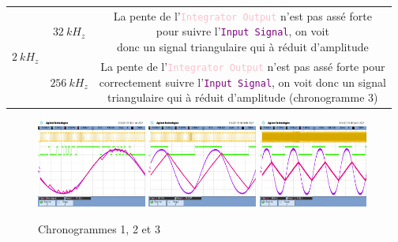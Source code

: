\documentclass[11pt, openright]{book}
\begin{document}
\begin{center}
\begin{tabular}{c|c|c}
        \hline
        \multirow{2}{*}{$2\ kH_z$} & $32\ kH_z$  & \makecell{La pente de l'\textcolor{pink}{\texttt{Integrator Output}} n'est pas assé forte      \\ pour suivre l'\textcolor{purple}{\texttt{Input Signal}}, on voit\\ donc un signal triangulaire qui à réduit d'amplitude}\\
        \cline{2-3}
                                   & $256\ kH_z$ & \makecell{La pente de l'\textcolor{pink}{\texttt{Integrator Output}} n'est pas assé forte pour \\correctement suivre l'\textcolor{purple}{\texttt{Input Signal}}, on voit donc un signal \\triangulaire qui à réduit d'amplitude (chronogramme 3)} \\
    \end{tabular}
\end{center}

\begin{figure}[ht!]
    \centering
    \includegraphics[width=0.32\textwidth]{./object/g5.png}
    \hspace{0.05\textwidth}
    \includegraphics[width=0.32\textwidth]{./object/g6.png}
    \hspace{0.05\textwidth}
    \includegraphics[width=0.32\textwidth]{./object/g7.png}
    \caption{Chronogrammes 1, 2 et 3}
\end{figure}
\end{document}
